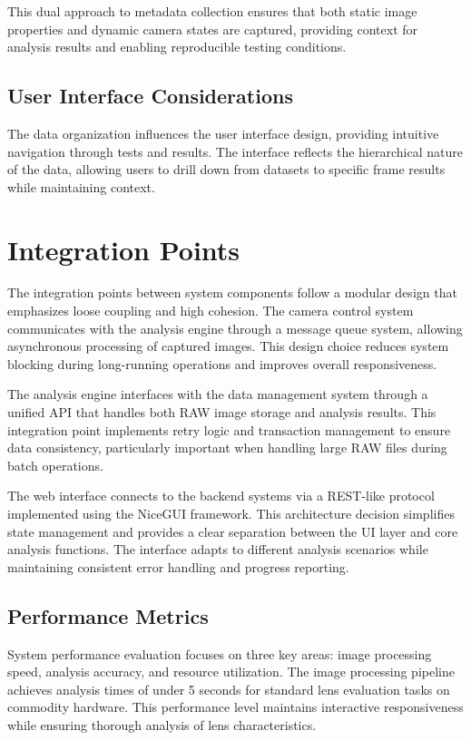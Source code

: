 This dual approach to metadata collection ensures that both static image properties and dynamic camera states are captured, providing context for analysis results and enabling reproducible testing conditions.

\subsection{User Interface Considerations}
The data organization influences the user interface design, providing intuitive navigation through tests and results. The interface reflects the hierarchical nature of the data, allowing users to drill down from datasets to specific frame results while maintaining context.

\section{Integration Points}

The integration points between system components follow a modular design that emphasizes loose coupling and high cohesion. The camera control system communicates with the analysis engine through a message queue system, allowing asynchronous processing of captured images. This design choice reduces system blocking during long-running operations and improves overall responsiveness.

The analysis engine interfaces with the data management system through a unified API that handles both RAW image storage and analysis results. This integration point implements retry logic and transaction management to ensure data consistency, particularly important when handling large RAW files during batch operations.

The web interface connects to the backend systems via a REST-like protocol implemented using the NiceGUI framework. This architecture decision simplifies state management and provides a clear separation between the UI layer and core analysis functions. The interface adapts to different analysis scenarios while maintaining consistent error handling and progress reporting.

\subsection{Performance Metrics}
System performance evaluation focuses on three key areas: image processing speed, analysis accuracy, and resource utilization. The image processing pipeline achieves analysis times of under 5 seconds for standard lens evaluation tasks on commodity hardware. This performance level maintains interactive responsiveness while ensuring thorough analysis of lens characteristics.

